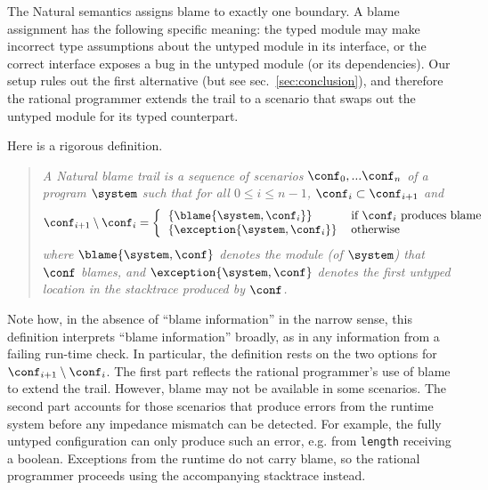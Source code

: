 
The Natural semantics assigns blame to exactly one boundary.  A blame assignment
has the following specific meaning: the typed module may make incorrect type
assumptions about the untyped module in its interface, or the correct
interface exposes a bug in the untyped module (or its dependencies). Our setup rules out the first
alternative (but see sec.~\ref{sec:conclusion}), and therefore the rational
programmer extends the trail to a scenario that swaps out the untyped
module for its typed counterpart.



Here is a rigorous definition. 
\begin{quote}
\it A \emph{Natural blame trail} is a sequence of scenarios $\conf_0,...\conf_n$ of
a program $\system$ such that for all $0 \leq i \leq n - 1$, $\conf_i \subset
\conf_{i+1}$ and
\[ \conf_{i+1} \setminus \conf_i = %
\left\{ %
\begin{tabular}{ll} %
$\{\blame{\system, \conf_i}\}$      & if $\conf_i$ produces blame \\ %
$\{\exception{\system, \conf_i}\}$  & otherwise \\ %
\end{tabular} \right. %
\]
where $\blame{\system, \conf}$ denotes the module (of $\system$) that $\conf$ blames,
and $\exception{\system, \conf}$ denotes the first untyped location in the stacktrace produced by $\conf$.
\end{quote}
Note how, in the absence of ``blame information'' in the narrow sense, 
this definition interprets ``blame information'' broadly, as in
any information from a failing run-time check.  
In particular, the definition rests on the two options for $\conf_{i+1} \setminus \conf_i$.
The first part reflects the rational programmer's use of blame to extend the
trail. However, blame may not be available in some scenarios. The second part
accounts for those scenarios that produce errors from the runtime system before
any impedance mismatch can be detected. For example, the fully untyped
configuration can only produce such an error, e.g. from {\tt length} receiving a
boolean. Exceptions from the runtime do not carry blame, so
the rational programmer proceeds using the accompanying stacktrace instead.

